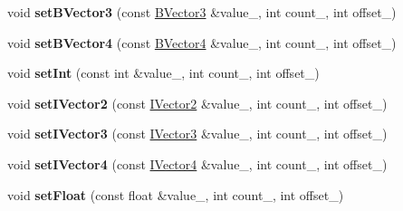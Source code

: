 \begin{DoxyCompactItemize}
\item 
void {\bfseries set\+B\+Vector3} (const \hyperlink{class_i_dream_sky_1_1_b_vector3}{B\+Vector3} \&value\+\_\+, int count\+\_, int offset\+\_)\hypertarget{class_i_dream_sky_1_1_g_x_uniform_a00b3b4fb7ddc3f38a02f5923fc48a15e}{}\label{class_i_dream_sky_1_1_g_x_uniform_a00b3b4fb7ddc3f38a02f5923fc48a15e}

\item 
void {\bfseries set\+B\+Vector4} (const \hyperlink{class_i_dream_sky_1_1_b_vector4}{B\+Vector4} \&value\+\_\+, int count\+\_, int offset\+\_)\hypertarget{class_i_dream_sky_1_1_g_x_uniform_a5e638e2af1ae107dfb11f7baceb3640a}{}\label{class_i_dream_sky_1_1_g_x_uniform_a5e638e2af1ae107dfb11f7baceb3640a}

\item 
void {\bfseries set\+Int} (const int \&value\+\_\+, int count\+\_, int offset\+\_)\hypertarget{class_i_dream_sky_1_1_g_x_uniform_a93de9d0048821d7eb1ad25e34b3dce12}{}\label{class_i_dream_sky_1_1_g_x_uniform_a93de9d0048821d7eb1ad25e34b3dce12}

\item 
void {\bfseries set\+I\+Vector2} (const \hyperlink{class_i_dream_sky_1_1_i_vector2}{I\+Vector2} \&value\+\_\+, int count\+\_, int offset\+\_)\hypertarget{class_i_dream_sky_1_1_g_x_uniform_aba61f2b188a63aa94546dc2aaaafa363}{}\label{class_i_dream_sky_1_1_g_x_uniform_aba61f2b188a63aa94546dc2aaaafa363}

\item 
void {\bfseries set\+I\+Vector3} (const \hyperlink{class_i_dream_sky_1_1_i_vector3}{I\+Vector3} \&value\+\_\+, int count\+\_, int offset\+\_)\hypertarget{class_i_dream_sky_1_1_g_x_uniform_ace1e9aa8711ff1a86d56e1d5a71f746e}{}\label{class_i_dream_sky_1_1_g_x_uniform_ace1e9aa8711ff1a86d56e1d5a71f746e}

\item 
void {\bfseries set\+I\+Vector4} (const \hyperlink{class_i_dream_sky_1_1_i_vector4}{I\+Vector4} \&value\+\_\+, int count\+\_, int offset\+\_)\hypertarget{class_i_dream_sky_1_1_g_x_uniform_a0d0bd2680a3f2175186e4d1660e03c6a}{}\label{class_i_dream_sky_1_1_g_x_uniform_a0d0bd2680a3f2175186e4d1660e03c6a}

\item 
void {\bfseries set\+Float} (const float \&value\+\_\+, int count\+\_, int offset\+\_)\hypertarget{class_i_dream_sky_1_1_g_x_uniform_ae1ad98730f78c05285ce2d8ab2cd0636}{}\label{class_i_dream_sky_1_1_g_x_uniform_ae1ad98730f78c05285ce2d8ab2cd0636}


\end{DoxyCompactItemize}
